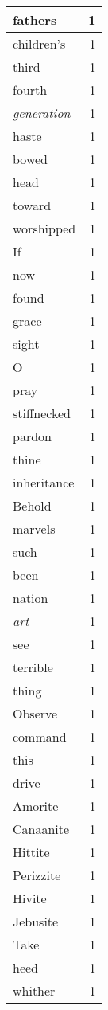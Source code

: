 \begin{center}
\begin{longtable}{l|r}
fathers & 1 \\ \hline
children's & 1 \\ \hline
third & 1 \\ \hline
fourth & 1 \\ \hline
\emph{generation} & 1 \\ \hline
haste & 1 \\ \hline
bowed & 1 \\ \hline
head & 1 \\ \hline
toward & 1 \\ \hline
worshipped & 1 \\ \hline
If & 1 \\ \hline
now & 1 \\ \hline
found & 1 \\ \hline
grace & 1 \\ \hline
sight & 1 \\ \hline
O & 1 \\ \hline
pray & 1 \\ \hline
stiffnecked & 1 \\ \hline
pardon & 1 \\ \hline
thine & 1 \\ \hline
inheritance & 1 \\ \hline
Behold & 1 \\ \hline
marvels & 1 \\ \hline
such & 1 \\ \hline
been & 1 \\ \hline
nation & 1 \\ \hline
\emph{art} & 1 \\ \hline
see & 1 \\ \hline
terrible & 1 \\ \hline
thing & 1 \\ \hline
Observe & 1 \\ \hline
command & 1 \\ \hline
this & 1 \\ \hline
drive & 1 \\ \hline
Amorite & 1 \\ \hline
Canaanite & 1 \\ \hline
Hittite & 1 \\ \hline
Perizzite & 1 \\ \hline
Hivite & 1 \\ \hline
Jebusite & 1 \\ \hline
Take & 1 \\ \hline
heed & 1 \\ \hline
whither & 1 \\ \hline

\end{longtable}
\end{center}
